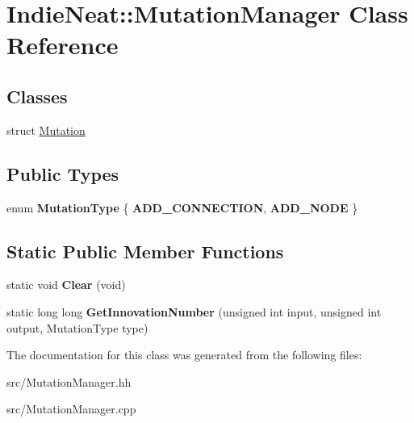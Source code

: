 \hypertarget{class_indie_neat_1_1_mutation_manager}{}\section{Indie\+Neat\+:\+:Mutation\+Manager Class Reference}
\label{class_indie_neat_1_1_mutation_manager}
\subsection*{Classes}
\begin{DoxyCompactItemize}
\item 
struct \hyperlink{struct_indie_neat_1_1_mutation_manager_1_1_mutation}{Mutation}
\end{DoxyCompactItemize}
\subsection*{Public Types}
\begin{DoxyCompactItemize}
\item 
\mbox{\label{class_indie_neat_1_1_mutation_manager_a71b9dfa0dd420edd288b446b003dda57}} 
enum {\bfseries Mutation\+Type} \{ {\bfseries A\+D\+D\+\_\+\+C\+O\+N\+N\+E\+C\+T\+I\+ON}, 
{\bfseries A\+D\+D\+\_\+\+N\+O\+DE}
 \}
\end{DoxyCompactItemize}
\subsection*{Static Public Member Functions}
\begin{DoxyCompactItemize}
\item 
\mbox{\label{class_indie_neat_1_1_mutation_manager_af803ebcafc0ca8ea4c485215e5448158}} 
static void {\bfseries Clear} (void)
\item 
\mbox{\label{class_indie_neat_1_1_mutation_manager_abfa9bd8fcf8c45e8daab19597091eb9c}} 
static long long {\bfseries Get\+Innovation\+Number} (unsigned int input, unsigned int output, Mutation\+Type type)
\end{DoxyCompactItemize}


The documentation for this class was generated from the following files\+:\begin{DoxyCompactItemize}
\item 
src/Mutation\+Manager.\+hh\item 
src/Mutation\+Manager.\+cpp\end{DoxyCompactItemize}
